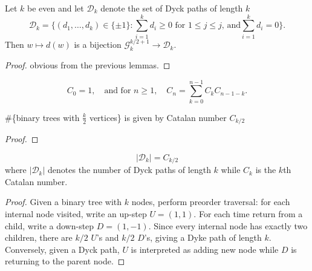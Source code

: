 \begin{lemma}
  \notready
  \label{lem:walk_to_Dyck_paths_bijection}
  Let $k$ be even and let $\mathcal{D}_k$ denote the set of Dyck paths of length $k$
  \[ \mathcal{D}_k = \{(d_1,\ldots,d_k)\in\{\pm 1\}\colon \sum_{i=1}^k d_i\ge 0\text{ for }1\le j\le j\text{, and}\sum_{i=1}^kd_i=0\}. \]
  Then $w\mapsto {d}(w)$ is a bijection $\mathcal{G}_k^{k/2+1}\to\mathcal{D}_k$.
\end{lemma}

\begin{proof}
  \notready
  obvious from the previous lemmas.
\end{proof}


\begin{definition}
  \mathlibok
  \label{def:Catalan_number}
  \[C_0 = 1, \quad \text{and for } n \geq 1, \quad C_n = \sum_{k=0}^{n-1} C_k C_{n-1-k}.\]
\end{definition}


\begin{lemma}
  \notready
  \label{lem:binary_tree_Catalan_number}
  \#\{binary trees with $\frac{k}{2}$ vertices\} is given by Catalan number $C_{k / 2}$
\end{lemma}

\begin{proof}
  \notready
\end{proof}


\begin{proposition}
  \notready
  \label{prop:Catalan_Dyck_samecardinality}
  \[|\mathcal{D}_k| = C_{k/2} \] where $|\mathcal{D}_k|$ denotes the number of Dyck paths of length $k$ while
  $C_k$ is the $k$th Catalan number.
\end{proposition}

\begin{proof}
  \notready
  Given a binary tree with $k$ nodes, perform preorder traversal: for each internal node visited, write
  an up-step \(U = (1,1)\). For each time return from a child, write a down-step \(D = (1,-1)\).
  Since every internal node has exactly two children, there are \(k/2\) \(U\)'s and \(k/2\) \(D\)'s,
  giving a Dyke path of length \(k\). Conversely, given a Dyck path, $U$ is interpreted as adding new node
  while $D$ is returning to the parent node.
\end{proof}


